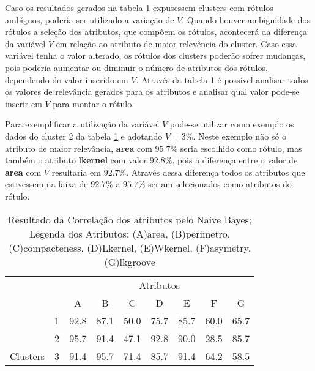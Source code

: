 Caso os resultados gerados na tabela \ref{tab:matrelevancia:seeds:nb} expusessem clusters com rótulos ambíguos, poderia ser utilizado a variação de ${V}$. Quando houver ambiguidade dos rótulos a seleção dos atributos, que compõem os rótulos, acontecerá da diferença da variável ${V}$ em relação ao atributo de maior relevência do cluster. Caso essa variável tenha o valor alterado, os rótulos dos clusters poderão sofrer mudanças, pois poderia aumentar  ou diminuir o número de atributos dos rótulos, dependendo do valor inserido em ${V}$. Através da tabela \ref{tab:matrelevancia:seeds:nb} é possível analisar todos os valores de relevância gerados para os atributos e analisar qual valor pode-se inserir em ${V}$ para montar o rótulo.

Para exemplificar a utilização da variável ${V}$ pode-se utilizar como exemplo os dados do cluster 2 da tabela \ref{tab:matrelevancia:seeds:nb} e adotando ${V=3\%}$.  Neste exemplo não só o atributo de maior relevância, \textbf{area} com ${95.7\%}$ seria escolhido como rótulo, mas também o atributo \textbf{lkernel} com valor ${92.8\%}$, pois a diferença entre o valor de \textbf{area} com ${V}$ resultaria em ${92.7\%}$. Através dessa diferença todos os atributos que estivessem na faixa de ${92.7\%}$ a  ${95.7\%}$ seriam selecionados como atributos do rótulo.

\begin{table}[!h]
    
    \caption{Resultado da Correlação dos atributos pelo Naive Bayes; Legenda dos Atributos: (A)area, (B)perimetro, (C)compacteness, (D)Lkernel, (E)Wkernel, (F)asymetry, (G)lkgroove}    
    \centering
   \small\addtolength{\tabcolsep}{+2pt}
    \begin{tabular}{|cl|c|c|c|c|c|c|c|}
        \hline \hline
                                &   & \multicolumn{7}{c|}{Atributos}          \\ \cline{3-9} 
        \multicolumn{1}{|l}{}                            &   & A    & B & C & D & E & F & G \\ \hline
        \multicolumn{1}{|c|}{}                           & 1 & 92.8 & 87.1   & 50.0      & 75.7 & 85.7 & 60.0   & 65.7   \\ \cline{2-9} 
        \multicolumn{1}{|c|}{}                           & 2 & 95.7 & 91.4   & 47.1      & 92.8 & 90.0 & 28.5  & 85.7  \\ \cline{2-9} 
        \multicolumn{1}{|c|}{\multirow{-3}{*}{Clusters}} & 3 & 91.4 & 95.7   & 71.4      & 85.7 & 91.4 & 64.2  & 58.5  \\ \hline
    \end{tabular}
    \label{tab:matrelevancia:seeds:nb} 
\end{table}


